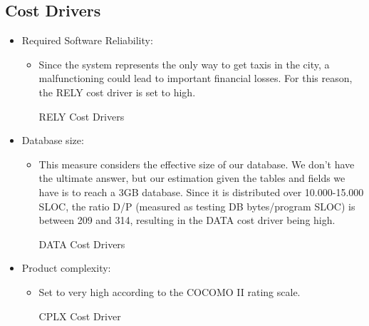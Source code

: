 \subsection{Cost Drivers}
\begin{itemize}
	\item Required Software Reliability:
	\begin{itemize}
	\item[] Since the system represents the only way to get taxis in the city, a malfunctioning could lead to important financial losses. For this reason, the RELY cost driver is set to high.
	\begin{costdriverstable}{RELY Cost Drivers}
		\hline
	\end{costdriverstable}
	\end{itemize}
\end{itemize}

\begin{itemize}
	\item Database size:
	\begin{itemize}
	\item[] This measure considers the effective size of our database. We don't have the ultimate answer, but our estimation given the tables and fields we have is to reach a 3GB database. Since it is distributed over 10.000-15.000 SLOC, the ratio D/P (measured as testing DB bytes/program SLOC) is between 209 and 314, resulting in the DATA cost driver being high. 
	\begin{costdriverstable}{DATA Cost Drivers}
		\hline
	\end{costdriverstable}
	\end{itemize}
\end{itemize}

\begin{itemize}
	\item Product complexity: 
	\begin{itemize}
	\item[] Set to very high according to the COCOMO II rating scale.
	\begin{costdriverstable}{CPLX Cost Driver}
	\end{costdriverstable}
	\end{itemize}
\end{itemize}

